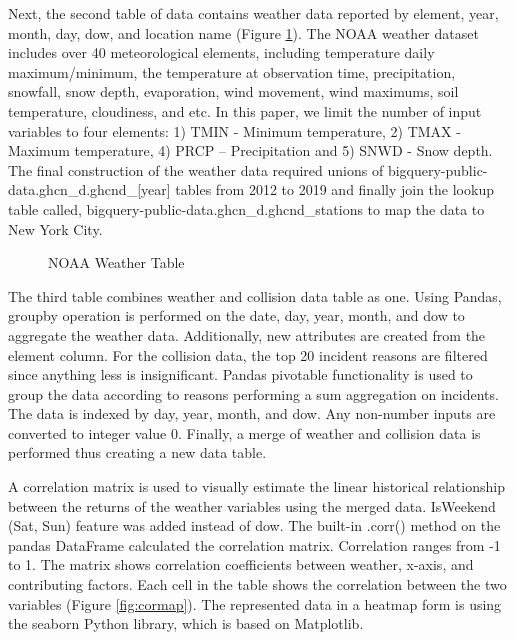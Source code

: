 \documentclass[conference]{IEEEtran}
\begin{document}
Next, the second table of data contains weather data reported by element, year, month, day, dow, and location name (Figure \ref{fig:noaatable}). The NOAA weather dataset includes over 40 meteorological elements\cite{NoaaRef}, including temperature daily maximum/minimum, the temperature at observation time, precipitation, snowfall, snow depth, evaporation, wind movement, wind maximums, soil temperature, cloudiness, and etc. In this paper, we limit the number of input variables to four elements: 1) TMIN - Minimum temperature, 2) TMAX - Maximum temperature, 4) PRCP – Precipitation and 5) SNWD - Snow depth. The final construction of the weather data required unions of bigquery-public-data.ghcn\_d.ghcnd\_[year] tables from 2012 to 2019 and finally join the lookup table called, bigquery-public-data.ghcn\_d.ghcnd\_stations to map the data to New York City.  
\begin{figure}[bth]
	\centering
	\caption{NOAA Weather Table}
	\label{fig:noaatable}
\end{figure}

The third table combines weather and collision data table as one. Using Pandas, groupby operation is performed on the date, day, year, month, and dow to aggregate the weather data. Additionally, new attributes are created from the element column. For the collision data, the top 20 incident reasons are filtered since anything less is insignificant. Pandas pivotable functionality is used to group the data according to reasons performing a sum aggregation on incidents. The data is indexed by day, year, month, and dow. Any non-number inputs are converted to integer value 0. Finally, a merge of weather and collision data is performed thus creating a new data table. 
 
A correlation matrix is used to visually estimate the linear historical relationship between the returns of the weather variables using the merged data. IsWeekend (Sat, Sun) feature was added instead of dow. The built-in .corr() method on the pandas DataFrame calculated the correlation matrix. Correlation ranges from -1 to 1. The matrix shows correlation coefficients between weather, x-axis, and contributing factors. Each cell in the table shows the correlation between the two variables (Figure \ref{fig:cormap}).  The represented data in a heatmap form is using the seaborn Python library, which is based on Matplotlib.
\end{document}
